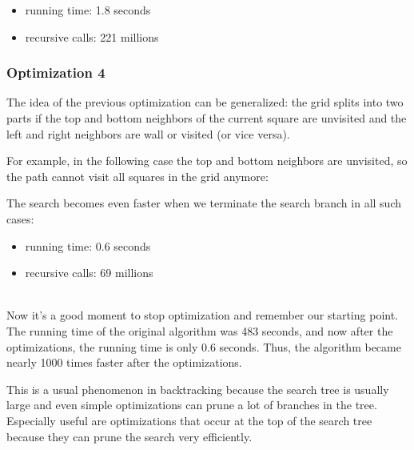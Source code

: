 \begin{itemize}
\item
running time: 1.8 seconds
\item
recursive calls: 221 millions
\end{itemize}

\subsubsection{Optimization 4}

The idea of the previous optimization
can be generalized:
the grid splits into two parts
if the top and bottom neighbors
of the current square are unvisited and
the left and right neighbors are
wall or visited (or vice versa).

For example, in the following case
the top and bottom neighbors are unvisited,
so the path cannot visit all squares
in the grid anymore:
\begin{center}
\end{center}
The search becomes even faster when we terminate
the search branch in all such cases:

\begin{itemize}
\item
running time: 0.6 seconds
\item
recursive calls: 69 millions
\end{itemize}

~\\
Now it's a good moment to stop optimization
and remember our starting point.
The running time of the original algorithm
was 483 seconds,
and now after the optimizations,
the running time is only 0.6 seconds.
Thus, the algorithm became nearly 1000 times
faster after the optimizations.

This is a usual phenomenon in backtracking
because the search tree is usually large
and even simple optimizations can prune
a lot of branches in the tree.
Especially useful are optimizations that
occur at the top of the search tree because
they can prune the search very efficiently.


